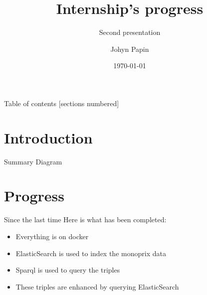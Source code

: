 \documentclass[10pt]{beamer}
\title{Internship's progress}
\subtitle{Second presentation}
\date{\today}
\author{Johyn Papin}
\institute{National Institute of Informatics}
\begin{document}
\maketitle

\begin{frame}{Table of contents}
  [sections numbered]
  \tableofcontents[hideallsubsections]
\end{frame}

\section{Introduction}

\begin{frame}{Summary Diagram}
\end{frame}

\section{Progress}

\begin{frame}{Since the last time}
    Here is what has been completed:
	\begin{itemize}
		\item Everything is on docker
	    \item ElasticSearch is used to index the monoprix data
	    \item Sparql is used to query the triples
	    \item These triples are enhanced by querying ElasticSearch
	\end{itemize}
\end{frame}
\end{document}
